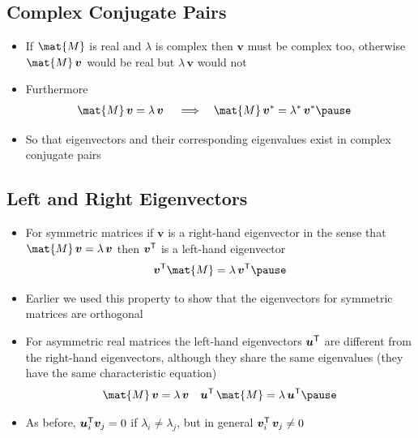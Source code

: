 
\begin{slide}
\section{Complex Conjugate Pairs}

\begin{PauseHighLight}
  \begin{itemize}
  \item If $\mat{M}$ is real and $\lambda$ is complex then $\bm{v}$ must
    be complex too, otherwise $\mat{M}\,\bm{v}$ would be real but
    $\lambda\,\bm{v}$ would not\pause
  \item Furthermore
    \begin{align*}
      \mat{M}\,\bm{v} &= \lambda\,\bm{v} & &\implies& \mat{M}\,\bm{v}^* &= \lambda^*\,\bm{v}^*\pause
    \end{align*}
  \item So that eigenvectors and their corresponding eigenvalues exist
    in complex conjugate pairs\pause
  \end{itemize}
\end{PauseHighLight}

\end{slide}


\begin{slide}
\section[-2]{Left and Right Eigenvectors}
  
\begin{PauseHighLight}\squeeze
  \begin{itemize}
  \item For symmetric matrices if $\bm{v}$ is a right-hand eigenvector
    in the sense that $\mat{M}\,\bm{v} = \lambda\, \bm{v}$ then
    $\bm{v}^{\textsf{T}}$ is a left-hand eigenvector
    \begin{align*}
      \bm{v}^\tr \mat{M} = \lambda\, \bm{v}^\tr\pause
    \end{align*}
  \item Earlier we used this property to show that the eigenvectors
    for symmetric matrices are orthogonal\pause
  \item For asymmetric real matrices the left-hand eigenvectors
    $\bm{u}^{\textsf{T}}$ are different from the right-hand eigenvectors, although
    they share the same eigenvalues (they have the same characteristic
    equation)
    \begin{align*}
      \mat{M}\,\bm{v} &= \lambda\, \bm{v}
      & \bm{u}^\tr\,\mat{M} = \lambda \, \bm{u}^\tr\pause
    \end{align*}
  \item As before, $\bm{u}_i^{\textsf{T}}\bm{v}_j = 0$ if
    $\lambda_i\neq\lambda_j$, but in general
    $\bm{v}_i^{\textsf{T}}\,\bm{v}_j\neq 0$\pause
  \end{itemize}
\end{PauseHighLight}

\end{slide}

